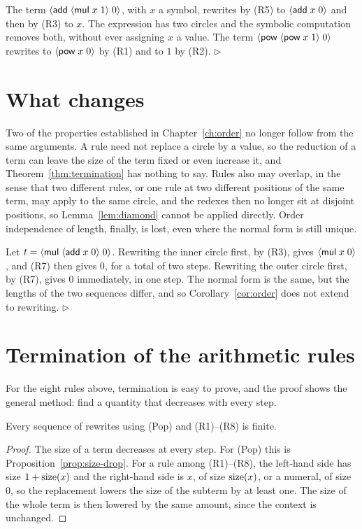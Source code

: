 \begin{example}
The term $\langle \mathsf{add}\; \langle \mathsf{mul}\; x\; 1\rangle\; 0\rangle$, with $x$ a symbol, rewrites by (R5) to $\langle \mathsf{add}\; x\; 0\rangle$ and then by (R3) to $x$. The expression has two circles and the symbolic computation removes both, without ever assigning $x$ a value. The term $\langle \mathsf{pow}\; \langle \mathsf{pow}\; x\; 1\rangle\; 0\rangle$ rewrites to $\langle \mathsf{pow}\; x\; 0\rangle$ by (R1) and to $1$ by (R2). \hfill$\triangleright$
\end{example}

\section{What changes}

Two of the properties established in Chapter~\ref{ch:order} no longer follow from the same arguments. A rule need not replace a circle by a value, so the reduction of a term can leave the size of the term fixed or even increase it, and Theorem~\ref{thm:termination} has nothing to say. Rules also may overlap, in the sense that two different rules, or one rule at two different positions of the same term, may apply to the same circle, and the redexes then no longer sit at disjoint positions, so Lemma~\ref{lem:diamond} cannot be applied directly. Order independence of length, finally, is lost, even where the normal form is still unique.

\begin{example}\label{ex:lengths}
Let $t=\langle \mathsf{mul}\; \langle \mathsf{add}\; x\; 0\rangle\; 0\rangle$. Rewriting the inner circle first, by (R3), gives $\langle \mathsf{mul}\; x\; 0\rangle$, and (R7) then gives $0$, for a total of two steps. Rewriting the outer circle first, by (R7), gives $0$ immediately, in one step. The normal form is the same, but the lengths of the two sequences differ, and so Corollary~\ref{cor:order} does not extend to rewriting. \hfill$\triangleright$
\end{example}

\section{Termination of the arithmetic rules}

For the eight rules above, termination is easy to prove, and the proof shows the general method: find a quantity that decreases with every step.

\begin{theorem}\label{thm:rewrite-term}
Every sequence of rewrites using (Pop) and (R1)--(R8) is finite.
\end{theorem}
\begin{proof}
The size of a term decreases at every step. For (Pop) this is Proposition~\ref{prop:size-drop}. For a rule among (R1)--(R8), the left-hand side has size $1+\operatorname{size}(x)$ and the right-hand side is $x$, of size $\operatorname{size}(x)$, or a numeral, of size $0$, so the replacement lowers the size of the subterm by at least one. The size of the whole term is then lowered by the same amount, since the context is unchanged.
\end{proof}

